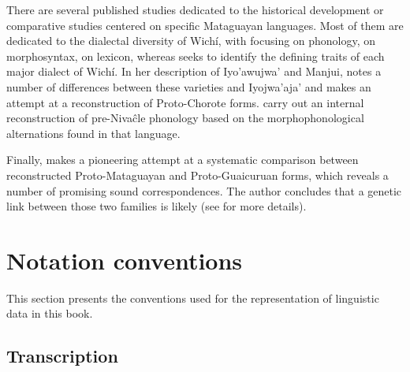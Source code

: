 There are several published studies dedicated to the historical development or comparative studies centered on specific Mataguayan languages. Most of them are dedicated to the dialectal diversity of Wichí, with \citet{EN71,LCB15} focusing on phonology, \citet{VN19} on morphosyntax, \citet{VN-MA-21} on lexicon, whereas \citet{VN20} seeks to identify the defining traits of each major dialect of Wichí. In her description of Iyo’awujwa’ and Manjui, \citet{AG83} notes a number of differences between these varieties and Iyojwa’aja’ and makes an attempt at a reconstruction of Proto-Chorote forms. \citet{LC-VG-07} carry out an internal reconstruction of pre-Nivaĉle phonology based on the morphophonological alternations found in that language.

Finally, \citet{PVB13a} makes a pioneering attempt at a systematic comparison between reconstructed Proto-Mataguayan and Proto-Guaicuruan forms, which reveals a number of promising sound correspondences. The author concludes that a genetic link between those two families is likely (see  for more details).

\section{Notation conventions}\label{notation}

This section presents the conventions used for the representation of linguistic data in this book.

\subsection{Transcription}\label{transcr}

